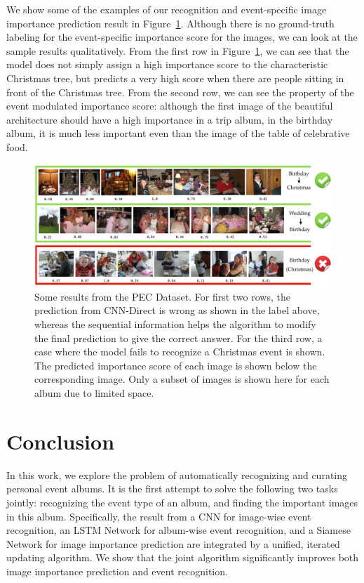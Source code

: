 \documentclass[runningheads]{llncs}
\begin{document}
We show some of the examples of our recognition and event-specific image importance prediction result in Figure~\ref{pec_result}. Although there is no ground-truth labeling for the event-specific importance score for the images, we can look at the sample results qualitatively. From the first row in Figure~\ref{pec_result}, we can see that the model does not simply assign a high importance score to the characteristic Christmas tree, but predicts a very high score when there are people sitting in front of the Christmas tree. From the second row, we can see the property of the event modulated importance score: although the first image of the beautiful architecture should have a high importance in a trip album, in the birthday album, it is much less important even than the image of the table of celebrative food.
\begin{figure}[ht]
\vspace{-0.1in}
\centering
\includegraphics[width=4.8in]{pec_result}
\caption{Some results from the PEC Dataset. For first two rows, the prediction from CNN-Direct is wrong as shown in the label above, whereas the sequential information helps the algorithm to modify the final prediction to give the correct answer. For the third row, a case where the model fails to recognize a Christmas event is shown. The predicted importance score of each image is shown below the corresponding image. Only a subset of images is shown here for each album due to limited space.}
\label{pec_result}
\vspace{-0.15in}
\end{figure}

\section{Conclusion}
In this work, we explore the problem of automatically recognizing and curating personal event albums. It is the first attempt to solve the following two tasks jointly: recognizing the event type of an album, and finding the important images in this album. Specifically, the result from a CNN for image-wise event recognition, an LSTM Network for album-wise event recognition, and a Siamese Network for image importance prediction are integrated by a unified, iterated updating algorithm. We show that the joint algorithm significantly improves both image importance prediction and event recognition.  
\clearpage



\clearpage


\end{document}

